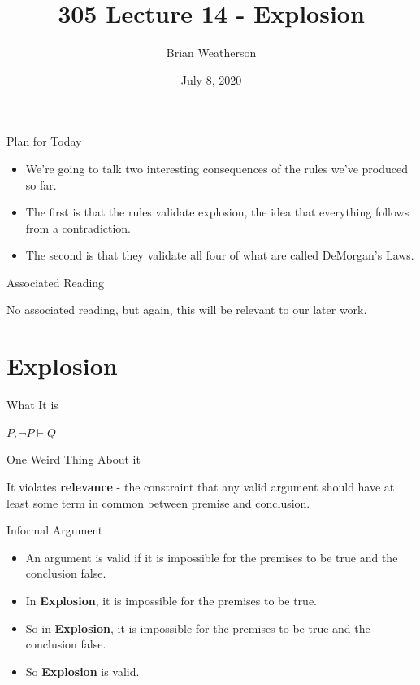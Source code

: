 \documentclass[
  ignorenonframetext,
]{beamer}
\title{305 Lecture 14 - Explosion}
\author{Brian Weatherson}
\date{July 8, 2020}
\providecommand{\tightlist}{%
  \setlength{\itemsep}{0pt}\setlength{\parskip}{0pt}}
\renewcommand{\,}{\text{, }}
\begin{document}
\frame{\titlepage}

\begin{frame}{Plan for Today}
\protect\hypertarget{plan-for-today}{}

\begin{itemize}
\tightlist
\item
  We're going to talk two interesting consequences of the rules we've
  produced so far.
\item
  The first is that the rules validate explosion, the idea that
  everything follows from a contradiction.
\item
  The second is that they validate all four of what are called
  DeMorgan's Laws.
\end{itemize}

\end{frame}

\begin{frame}{Associated Reading}
\protect\hypertarget{associated-reading}{}

No associated reading, but again, this will be relevant to our later
work.

\end{frame}

\hypertarget{explosion}{%
\section{Explosion}\label{explosion}}

\begin{frame}{What It is}
\protect\hypertarget{what-it-is}{}

\(P, \neg P \vdash Q\)

\end{frame}

\begin{frame}{One Weird Thing About it}
\protect\hypertarget{one-weird-thing-about-it}{}

It violates \textbf{relevance} - the constraint that any valid argument
should have at least some term in common between premise and conclusion.

\end{frame}

\begin{frame}{Informal Argument}
\protect\hypertarget{informal-argument}{}

\begin{itemize}[<+->]
\tightlist
\item
  An argument is valid if it is impossible for the premises to be true
  and the conclusion false.
\item
  In \textbf{Explosion}, it is impossible for the premises to be true.
\item
  So in \textbf{Explosion}, it is impossible for the premises to be true
  and the conclusion false.
\item
  So \textbf{Explosion} is valid.
\end{itemize}

\end{frame}
\end{document}
